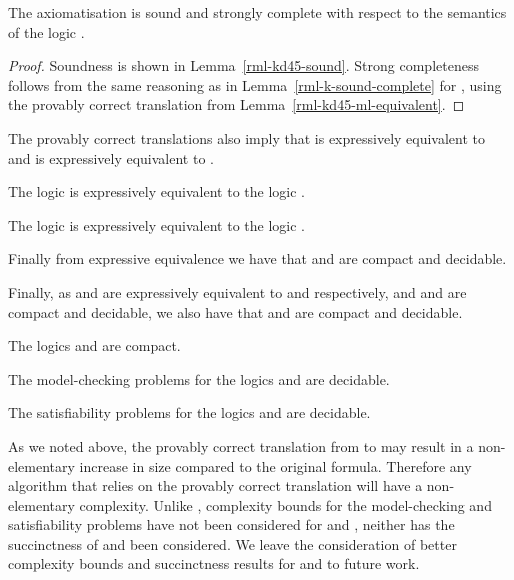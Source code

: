 \begin{theorem}\label{rml-kd45-sound-complete}
The axiomatisation \axiomRmlKFF{} is sound and strongly complete with respect to the semantics of the logic \logicRmlKD{}.
\end{theorem}

\begin{proof}
Soundness is shown in Lemma~\ref{rml-kd45-sound}.
Strong completeness follows from the same reasoning as in Lemma~\ref{rml-k-sound-complete} for \axiomRmlK{}, using the provably correct translation from Lemma~\ref{rml-kd45-ml-equivalent}.
\end{proof}

\pagebreak

The provably correct translations also imply that \logicRmlKFF{} is expressively equivalent to \logicKFF{} and \logicRmlKD{} is expressively equivalent to \logicKD{}.

\begin{corollary}
The logic \logicRmlKFF{} is expressively equivalent to the logic \logicKFF{}.
\end{corollary}

\begin{corollary}
The logic \logicRmlKD{} is expressively equivalent to the logic \logicKD{}.
\end{corollary}

Finally from expressive equivalence we have that \logicRmlKFF{} and \logicRmlKD{} are compact and decidable.

Finally, as \logicRmlKFF{} and \logicRmlKD{} are expressively equivalent to \logicKFF{} and \logicKF{} respectively, and \logicKFF{} and \logicKD{} are compact and decidable, we also have that \logicRmlKFF{} and \logicRmlKD{} are compact and decidable.

\begin{corollary}
The logics \logicRmlKFF{} and \logicRmlKD{} are compact.
\end{corollary}

\begin{corollary}
The model-checking problems for the logics \logicRmlKFF{} and \logicRmlKD{} are decidable.
\end{corollary}

\begin{corollary}
The satisfiability problems for the logics \logicRmlKFF{} and \logicRmlKD{} are decidable.
\end{corollary}

As we noted above, the provably correct translation from \langRml{} to \langMl{} may result in a non-elementary increase in size compared to the original formula.
Therefore any algorithm that relies on the provably correct translation will have a non-elementary complexity.
Unlike \logicRmlK{}, complexity bounds for the model-checking and satisfiability problems have not been considered for \logicRmlKFF{} and \logicRmlKD{}, neither has the succinctness of \logicRmlKFF{} and \logicRmlKD{} been considered.
We leave the consideration of better complexity bounds and succinctness results for \logicRmlKFF{} and \logicRmlKD{} to future work.
